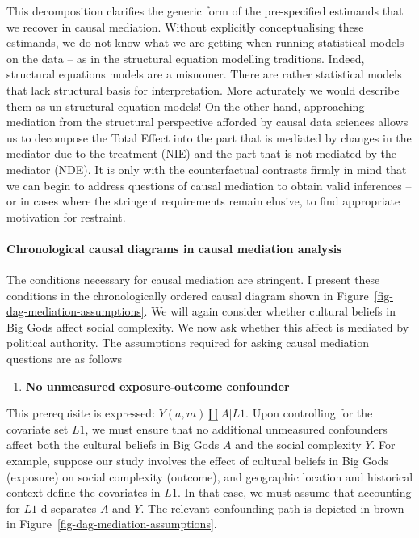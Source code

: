 \documentclass[
  singlecolumn,
  9pt]{article}
\let\oldparagraph\paragraph
\renewcommand{\paragraph}[1]{\oldparagraph{#1}\mbox{}}
\providecommand{\tightlist}{%
  \setlength{\itemsep}{0pt}\setlength{\parskip}{0pt}}\usepackage{longtable,booktabs,array}
\begin{document}
This decomposition clarifies the generic form of the pre-specified
estimands that we recover in causal mediation. Without explicitly
conceptualising these estimands, we do not know what we are getting when
running statistical models on the data -- as in the structural equation
modelling traditions. Indeed, structural equations models are a
misnomer. There are rather statistical models that lack structural basis
for interpretation. More acturately we would describe them as
un-structural equation models! On the other hand, approaching mediation
from the structural perspective afforded by causal data sciences allows
us to decompose the Total Effect into the part that is mediated by
changes in the mediator due to the treatment (NIE) and the part that is
not mediated by the mediator (NDE). It is only with the counterfactual
contrasts firmly in mind that we can begin to address questions of
causal mediation to obtain valid inferences -- or in cases where the
stringent requirements remain elusive, to find appropriate motivation
for restraint.

\paragraph{Chronological causal diagrams in causal mediation
analysis}\label{chronological-causal-diagrams-in-causal-mediation-analysis}

The conditions necessary for causal mediation are stringent. I present
these conditions in the chronologically ordered causal diagram shown in
Figure~\ref{fig-dag-mediation-assumptions}. We will again consider
whether cultural beliefs in Big Gods affect social complexity. We now
ask whether this affect is mediated by political authority. The
assumptions required for asking causal mediation questions are as
follows

\begin{enumerate}
\def\labelenumi{\arabic{enumi}.}
\tightlist
\item
  \textbf{No unmeasured exposure-outcome confounder}
\end{enumerate}

This prerequisite is expressed: \(Y(a,m) \coprod A | L1\). Upon
controlling for the covariate set \(L1\), we must ensure that no
additional unmeasured confounders affect both the cultural beliefs in
Big Gods \(A\) and the social complexity \(Y\). For example, suppose our
study involves the effect of cultural beliefs in Big Gods (exposure) on
social complexity (outcome), and geographic location and historical
context define the covariates in \(L1\). In that case, we must assume
that accounting for \(L1\) d-separates \(A\) and \(Y\). The relevant
confounding path is depicted in brown in
Figure~\ref{fig-dag-mediation-assumptions}.
\end{document}
